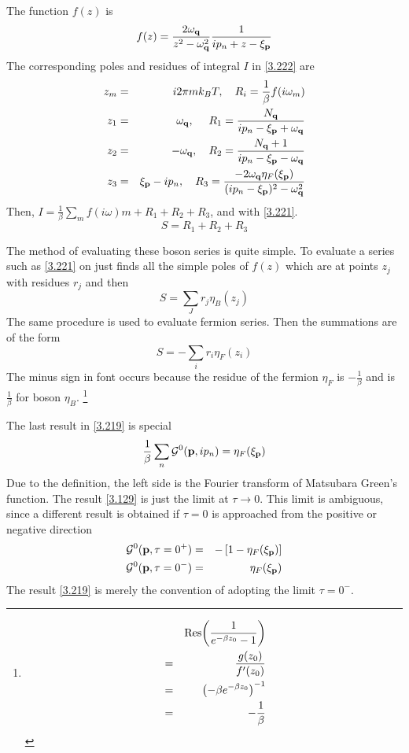 The function $f(z)$ is
\begin{equation}
  f(z) = \frac{2\omega_{\mathbf{q}}}{z^2-\omega_{\mathbf{q}}^2} \frac{1}{ip_n + z - \xi_{\mathbf{p}}}  \label{3.224}
\end{equation}
The corresponding poles and residues of integral $I$ in \eqref{3.222} are
\begin{eqnarray}
  z_m &=& i 2\pi m k_B T,~ ~ ~ R_i = \frac{1}{\beta}f(i\omega_m)  \nonumber\\
  z_1 &=& \omega_{\mathbf{q}}, ~ ~ ~ ~ R_1 = \frac{N_{\mathbf{q}}}{ip_n- \xi_{\mathbf{p}}+ \omega_{\mathbf{q}}} \nonumber \\
  z_2 &=& -\omega_{\mathbf{q}}, ~ ~ ~ R_2 = \frac{N_{\mathbf{q}}+1}{ip_n -\xi_{\mathbf{p}}-\omega_{\mathbf{q}}} \nonumber \\
  z_3 &=& \xi_{\mathbf{p}} - ip_n, ~ ~ ~ R_3 = \frac{-2\omega_{\mathbf{q}} \eta_F(\xi_{\mathbf{p}})}{(ip_n-\xi_{\mathbf{p}})^2-\omega_{\mathbf{q}}^2} \label{3.225}
\end{eqnarray}
Then, $I = \frac{1}{\beta} \sum_m f(i\omega)m + R_1 + R_2 + R_3$, and with \eqref{3.221}.
\begin{equation}
  S = R_1 + R_2 + R_3 \label{3.228}
\end{equation}

The method of evaluating these boson series is quite simple.
To evaluate a series such as \eqref{3.221} on just finds all the simple poles of $f(z)$ which are at points $z_j$ with residues $r_j$ and then
\begin{equation}
  S = \sum_J r_j \eta_B(z_j)  \label{3.229}
\end{equation}
The same procedure is used to evaluate fermion series. Then the summations are of the form
\begin{equation}
  S = - \sum_i r_i \eta_F(z_i)  \label{3.231}
\end{equation}
The minus sign in font occurs because the residue of the fermion $\eta_F$ is $-\frac{1}{\beta}$ and is $\frac{1}{\beta}$ for boson $\eta_B$.
\footnote{
\begin{eqnarray}
    && \Res(\frac{1}{e^{-\beta z_0}-1}) \nonumber \\
    &=& \frac{g(z_0)}{f'(z_0)} \nonumber \\
    &=& \left( -\beta e^{-\beta z_0} \right)^{-1} \nonumber \\
    &=& -\frac{1}{\beta} \nonumber
\end{eqnarray}
}

The last result in \eqref{3.219} is special
\begin{equation}
    \frac{1}{\beta} \sum_n \mathcal{G}^0 (\mathbf{p},ip_n) = \eta_F(\xi_{\mathbf{p}}) \nonumber
\end{equation}
Due to the definition, the left side is the Fourier transform of Matsubara Green's function.
The result \eqref{3.129} is just the limit at $\tau \to 0$.
This limit is ambiguous, since a different result is obtained if $\tau=0$ is approached from the positive or negative direction
\begin{eqnarray}
    \mathcal{G}^0(\mathbf{p},\tau= 0^+) &=& - \left[1-\eta_F(\xi_{\mathbf{p}})\right] \label{3.238}\\
    \mathcal{G}^0(\mathbf{p},\tau= 0^-) &=& \eta_F(\xi_{\mathbf{p}})    \label{3.239}
\end{eqnarray}
The result \eqref{3.219} is merely the convention of adopting the limit $\tau = 0^-$.

